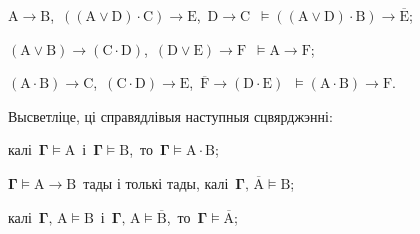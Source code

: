\begin{problemList}
\begin{belarusianEnumerate}
\item $\boldsymbol{\mathrm{A}} \to \boldsymbol{\mathrm{B}}$,\, $((\boldsymbol{\mathrm{A}}
\vee \boldsymbol{\mathrm{D}}) \cdot \boldsymbol{\mathrm{C}}) \to \boldsymbol{\mathrm{E}}$,\,
$\boldsymbol{\mathrm{D}} \to \boldsymbol{\mathrm{C}}$\, $\vDash ((\boldsymbol{\mathrm{A}} \vee \boldsymbol{\mathrm{D}}) \cdot \boldsymbol{\mathrm{B}}) \to \overline{\boldsymbol{\mathrm{E}}}$;

\item $(\boldsymbol{\mathrm{A}} \vee \boldsymbol{\mathrm{B}}) \to (\boldsymbol{\mathrm{C}} \cdot
\boldsymbol{\mathrm{D}})$,\, $(\boldsymbol{\mathrm{D}} \vee \boldsymbol{\mathrm{E}}) \to
\boldsymbol{\mathrm{F}}$\, $\vDash \boldsymbol{\mathrm{A}} \to \boldsymbol{\mathrm{F}}$;

\item $(\boldsymbol{\mathrm{A}} \cdot \boldsymbol{\mathrm{B}}) \to \boldsymbol{\mathrm{C}}$,\,
$(\boldsymbol{\mathrm{C}} \cdot \boldsymbol{\mathrm{D}}) \to \boldsymbol{\mathrm{E}}$,\,
$\overline{\boldsymbol{\mathrm{F}}} \to (\boldsymbol{\mathrm{D}} \cdot \boldsymbol{\mathrm{E}})$\,
$\vDash (\boldsymbol{\mathrm{A}} \cdot \boldsymbol{\mathrm{B}}) \to \boldsymbol{\mathrm{F}}$.

\end{belarusianEnumerate}

\smallskip

\item
Высветліце, ці справядлівыя наступныя сцвярджэнні: \\

\begin{belarusianEnumerate}

\item калі\, $\boldsymbol{\Gamma} \vDash \boldsymbol{\mathrm{A}}$\, і\, $\boldsymbol{\Gamma}
\vDash \boldsymbol{\mathrm{B}}$,\, то\, $\boldsymbol{\Gamma} \vDash \boldsymbol{\mathrm{A}} \cdot
\boldsymbol{\mathrm{B}}$;

\item $\boldsymbol{\Gamma} \vDash \boldsymbol{\mathrm{A}} \to \boldsymbol{\mathrm{B}}$\, тады
і толькі тады, калі\, $\boldsymbol{\Gamma},\, \overline{\boldsymbol{\mathrm{A}}} \vDash \boldsymbol{\mathrm{B}}$;

\item калі\, $\boldsymbol{\Gamma},\, \boldsymbol{\mathrm{A}} \vDash \boldsymbol{\mathrm{B}}$\, і\,
$\boldsymbol{\Gamma},\, \boldsymbol{\mathrm{A}} \vDash \overline{\boldsymbol{\mathrm{B}}}$,\, то\,
$\boldsymbol{\Gamma} \vDash \overline{\boldsymbol{\mathrm{A}}}$;


\end{belarusianEnumerate}
\end{problemList}
